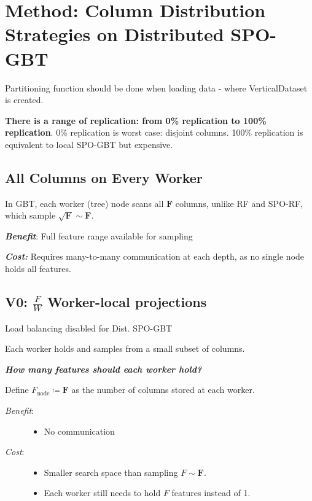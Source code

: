 \documentclass[sigconf,screen]{acmart}
\begin{document}
\section{Method: Column Distribution Strategies on Distributed SPO-GBT}

Partitioning function should be done when loading data - where VerticalDataset is created. 

\textbf{There is a range of replication: from 0\% replication to 100\% replication}. 0\% replication is worst case: disjoint columns. 100\% replication is equivalent to local SPO-GBT but expensive.

\subsection{All Columns on Every Worker}

In GBT, each worker (tree) node scans all $\mathbf{F}$ columns, unlike RF and SPO-RF, which sample $\sqrt{\mathbf{F}} \sim \mathbf{F}$. \newline\mbox{}

\textbf{\textit{Benefit}}: Full feature range available for sampling

\textbf{\textit{Cost:}} Requires many-to-many communication at each depth, as no single node holds all features.


\subsection{V0: \texorpdfstring{$\frac{F}{W}$}{F/W} Worker-local projections}


Load balancing disabled for Dist. SPO-GBT


Each worker holds and samples from a small subset of columns.

\textbf{\textit{How many features should each worker hold?}}

Define $F_{\text{node}} \coloneqq \mathbf{F}$ as the number of columns stored at each worker.



\begin{description}
    \item[\textit{Benefit}:]
    \begin{itemize}
        \item No communication
    \end{itemize}
\end{description}

\begin{description}
    \item[\textit{Cost}:]
    \begin{itemize}
        \item Smaller search space than sampling $F \sim \mathbf{F}$.
        \item Each worker still needs to hold $F$ features instead of 1.
    \end{itemize}
\end{description}
\end{document}
